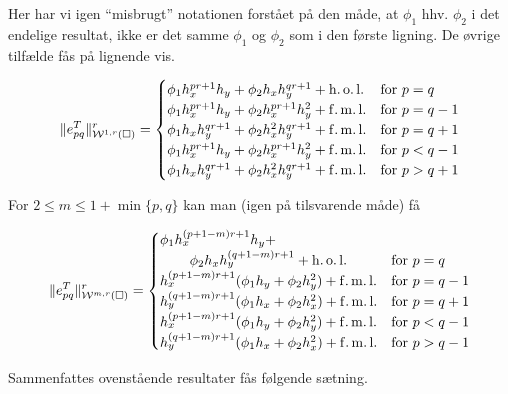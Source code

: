 Her har vi igen ``misbrugt'' notationen forstået på den måde, at
$\phi_1$ hhv. $\phi_2$ i det endelige resultat, ikke er det samme
$\phi_1$ og $\phi_2$ som i den første ligning. De øvrige tilfælde fås
på lignende vis.

\begin{equation} \label{fejl4}
\|e_{pq}^T\|_{{\mathcal W}^{1,r}(\Box)}^r =
\begin{cases}
  \phi_1 h_x^{pr+1} h_y + \phi_2 h_x h_y^{qr+1} + \operatorname{h.o.l.} &
    \text{for $p=q$} \\
  \phi_1 h_x^{pr+1} h_y + \phi_2 h_x^{pr+1} h_y^2 + \operatorname{f.m.l.} &
    \text{for $p=q-1$} \\
  \phi_1 h_x h_y^{qr+1} + \phi_2 h_x^2 h_y^{qr+1} + \operatorname{f.m.l.} &
    \text{for $p=q+1$} \\
  \phi_1 h_x^{pr+1} h_y + \phi_2 h_x^{pr+1} h_y^2 + \operatorname{f.m.l.} &
    \text{for $p<q-1$} \\
  \phi_1 h_x h_y^{qr+1} + \phi_2 h_x^2 h_y^{qr+1} + \operatorname{f.m.l.} &
    \text{for $p>q+1$} \\
\end{cases}
\end{equation}

For $2\leq m \leq 1 + \min \{ p,q \}$ kan man (igen på tilsvarende
måde) få

\begin{equation} \label{fejl5}
\|e_{pq}^T\|_{{\mathcal W}^{m,r}(\Box)}^r =
\begin{cases}
  \phi_1 h_x^{(p+1-m)r+1} h_y + \\
  \phantom{\phi_1 h_x} \phi_2 h_x h_y^{(q+1-m)r+1} + \operatorname{h.o.l.} &
    \text{for $p=q$} \\
  h_x^{(p+1-m)r+1}(\phi_1 h_y +\phi_2 h_y^2) + \operatorname{f.m.l.} & \text{for $p=q-1$} \\
  h_y^{(q+1-m)r+1}(\phi_1 h_x +\phi_2 h_x^2) + \operatorname{f.m.l.} & \text{for $p=q+1$} \\
  h_x^{(p+1-m)r+1}(\phi_1 h_y +\phi_2 h_y^2) + \operatorname{f.m.l.} & \text{for $p<q-1$} \\
  h_y^{(q+1-m)r+1}(\phi_1 h_x +\phi_2 h_x^2) + \operatorname{f.m.l.} & \text{for $p>q-1$} \\
\end{cases}
\end{equation}

Sammenfattes ovenstående resultater fås følgende sætning.

